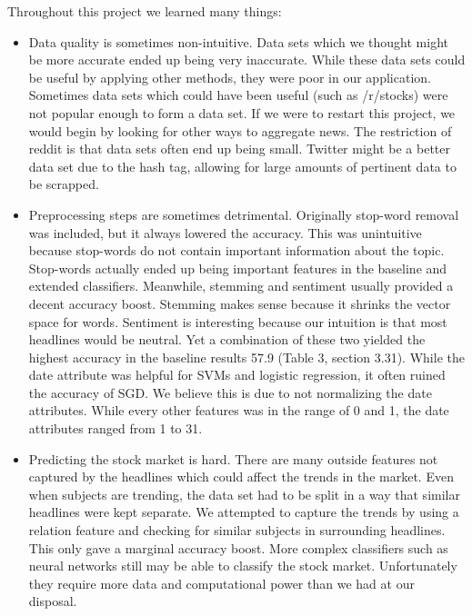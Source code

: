 \documentclass[11pt,a4paper]{article}
\begin{document}
Throughout this project we learned many things:
\begin{itemize}
\item Data quality is sometimes non-intuitive. Data sets which we thought might be more accurate ended up being very inaccurate. While these data sets could be useful by applying other methods, they were poor in our application. Sometimes data sets which could have been useful (such as /r/stocks) were not popular enough to form a data set. If we were to restart this project, we would begin by looking for other ways to aggregate news. The restriction of reddit is that data sets often end up being small. Twitter might be a better data set due to the hash tag, allowing for large amounts of pertinent data to be scrapped.\\

\item Preprocessing steps are sometimes detrimental. Originally stop-word removal was included, but it always lowered the accuracy. This was unintuitive because stop-words  do not contain important information about the topic. Stop-words actually ended up being important features in the baseline and extended classifiers. Meanwhile, stemming and sentiment usually provided a decent accuracy boost. Stemming makes sense because it shrinks the vector space for words. Sentiment is interesting because our intuition is that most headlines would be neutral. Yet a combination of these two yielded the highest accuracy in the baseline results 57.9 (Table 3, section 3.31). While the date attribute was helpful for SVMs and logistic regression, it often ruined the accuracy of SGD. We believe this is due to not normalizing the date attributes. While every other features was in the range of 0 and 1, the date attributes ranged from 1 to 31.\\

\item Predicting the stock market is hard. There are many outside features not captured by the headlines which could affect the trends in the market. Even when subjects are trending, the data set had to be split in a way that similar headlines were kept separate. We attempted to capture the trends by using a relation feature and checking for similar subjects in surrounding headlines. This only gave a marginal accuracy boost. More complex classifiers such as neural networks still may be able to classify the stock market. Unfortunately they require more data and computational power than we had at our disposal. \\
\end{itemize}
\end{document}

